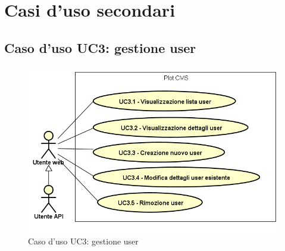 
\chapter{Casi d'uso secondari}

\hypertarget{UC3}{}
\section{Caso d'uso UC3: gestione user}

        \begin{figure}[H]
            \centering
            \includegraphics[scale=0.95, width=\textwidth]{immagini/usecase/UC3.png}
            \caption{Caso d'uso UC3: gestione user}\label{fig:UC3} 
        \end{figure}
